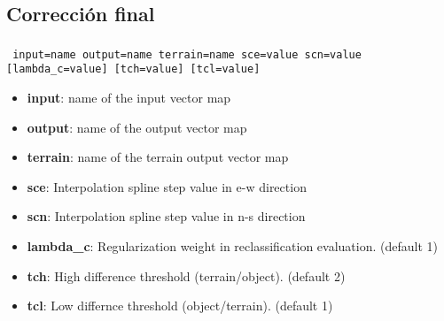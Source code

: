 \subsection{Corrección final}
\begin{frame}[shrink=04]
 \frametitle{}
\begin{beamerboxesrounded}[shadow=true]{\textbf{}\texttt{ input=name  output=name  terrain=name  sce=value  scn=value  [lambda\_c=value]  [tch=value]  [tcl=value]}}
\begin{itemize}
 \item \textbf{input}: name of the input vector map
 \item \textbf{output}: name of the output vector map
 \item \textbf{terrain}: name of the terrain output vector map
 \item \textbf{sce}: Interpolation spline step value in e-w direction
 \item \textbf{scn}: Interpolation spline step value in n-s direction
 \item \textbf{lambda\_c}: Regularization weight in reclassification evaluation. (default 1)
 \item \textbf{tch}: High difference threshold (terrain/object). (default 2)
 \item \textbf{tcl}: Low differnce threshold (object/terrain). (default 1)
\end{itemize}
\end{beamerboxesrounded}
\vcorr
\end{frame}
\pgfdeclareimage[width=0.45\textwidth]{corr}{images/correction}

